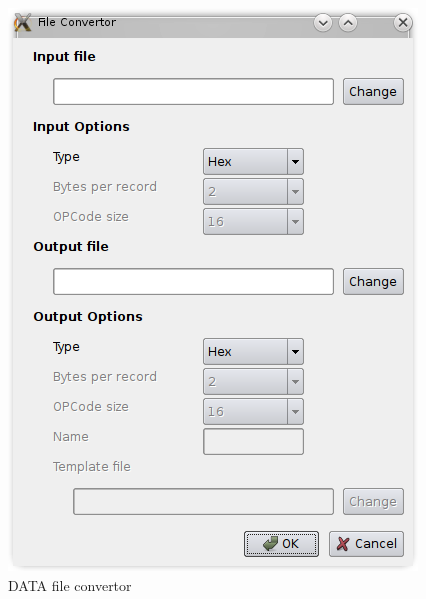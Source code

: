                     \begin{figure}
                        \centering{}
                        \includegraphics [scale=1]{img/DATA_convertor.png}
                        \caption{DATA file convertor}
                    \end{figure}

